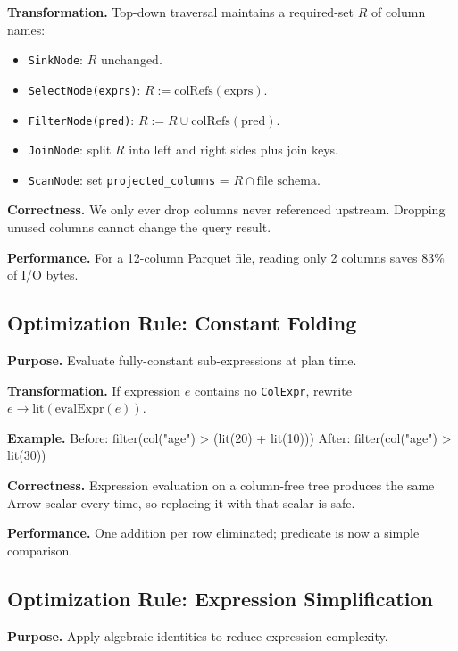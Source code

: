 \documentclass[11pt]{article}
\let\oldverbatim=\verbatim
\let\oldendverbatim=\endverbatim
\renewenvironment{verbatim}{\vspace{-6pt}\oldverbatim}{\oldendverbatim\vspace{-4pt}}
\begin{document}
\textbf{Transformation.} Top-down traversal maintains a required-set \(R\) of 
column names:

\begin{itemize}
  \item \texttt{SinkNode}: \(R\) unchanged.
  \item \texttt{SelectNode(exprs)}: \(R := \text{colRefs}(\text{exprs})\).
  \item \texttt{FilterNode(pred)}: \(R := R \cup \text{colRefs}(\text{pred})\).
  \item \texttt{JoinNode}: split \(R\) into left and right sides plus join keys.
  \item \texttt{ScanNode}: set \texttt{projected\_columns} = \(R \cap \text{file schema}\).
\end{itemize}

\textbf{Correctness.} We only ever drop columns never referenced upstream. 
Dropping unused columns cannot change the query result.

\textbf{Performance.} For a 12-column Parquet file, reading only 2 columns saves 
83\% of I/O bytes.

\subsection{Optimization Rule: Constant Folding}

\textbf{Purpose.} Evaluate fully-constant sub-expressions at plan time.

\textbf{Transformation.} If expression \(e\) contains no \texttt{ColExpr}, 
rewrite \(e \to \text{lit}(\text{evalExpr}(e))\).

\textbf{Example.}
\begin{verbatim}
Before: filter(col("age") > (lit(20) + lit(10)))
After:  filter(col("age") > lit(30))
\end{verbatim}

\textbf{Correctness.} Expression evaluation on a column-free tree produces 
the same Arrow scalar every time, so replacing it with that scalar is safe.

\textbf{Performance.} One addition per row eliminated; predicate is now a 
simple comparison.

\subsection{Optimization Rule: Expression Simplification}

\textbf{Purpose.} Apply algebraic identities to reduce expression complexity.
\end{document}
